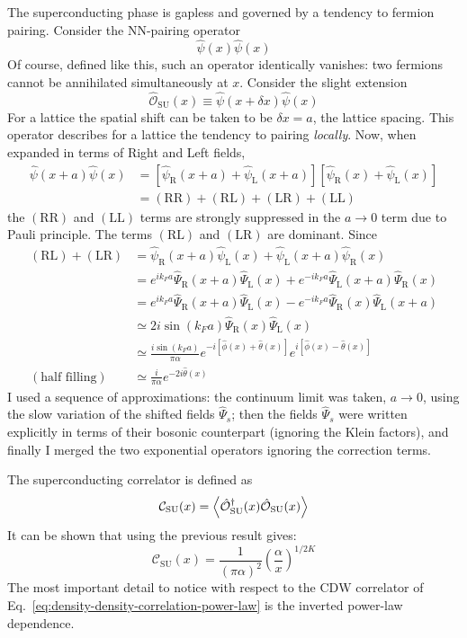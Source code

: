 The superconducting phase is gapless and governed by a tendency to fermion pairing. Consider the NN-pairing operator
\[
	\hat \psi(x) \hat \psi(x)
\]
Of course, defined like this, such an operator identically vanishes: two fermions cannot be annihilated simultaneously at $x$. Consider the slight extension
\[
	\hat{\mathcal{O}}_\mathrm{SU}(x) \equiv \hat \psi (x+\delta x) \hat \psi (x)
\]
For a lattice the spatial shift can be taken to be $\delta x = a$, the lattice spacing. This operator describes for a lattice the tendency to pairing \textit{locally}. Now, when expanded in terms of Right and Left fields,
\[
	\begin{aligned}
		\hat \psi (x+a) \hat \psi(x) &= \left[
			\hat \psi_\mathrm{R} (x+a) +
			\hat \psi_\mathrm{L} (x+a)
		\right] \left[
			\hat \psi_\mathrm{R} (x) +
			\hat \psi_\mathrm{L} (x)
		\right] \\
		&= (\mathrm{RR}) + (\mathrm{RL}) + (\mathrm{LR}) + (\mathrm{LL})
	\end{aligned}
\]
the $(\mathrm{RR})$ and $(\mathrm{LL})$ terms are strongly suppressed in the $a \to 0$ term due to Pauli principle. The terms $(\mathrm{RL})$ and $(\mathrm{LR})$ are dominant. Since
\[
	\begin{aligned}
		(\mathrm{RL}) + (\mathrm{LR}) &= \hat \psi_\mathrm{R} (x+a) \hat \psi_\mathrm{L} (x) + \hat \psi_\mathrm{L} (x+a) \hat \psi_\mathrm{R} (x) \\
		&= e^{ik_F a} \hat \Psi_\mathrm{R} (x+a) \hat \Psi_\mathrm{L} (x) + e^{-ik_F a} \hat \Psi_\mathrm{L} (x+a) \hat \Psi_\mathrm{R} (x) \\
		&= e^{ik_F a} \hat \Psi_\mathrm{R} (x+a) \hat \Psi_\mathrm{L} (x) - e^{-ik_F a} \hat \Psi_\mathrm{R} (x) \hat \Psi_\mathrm{L} (x+a)\\
		&\simeq 2i \sin(k_F a) \hat \Psi_\mathrm{R} (x) \hat \Psi_\mathrm{L} (x) \\
		&\simeq \frac{i \sin(k_F a)}{\pi\alpha} e^{-i \left[ \hat \phi(x) + \hat \theta(x) \right] } e^{i \left[ \hat \phi(x) - \hat \theta(x) \right]} \\
		(\text{half filling})&\simeq \frac{i}{\pi\alpha} e^{-2i\hat\theta(x)}
	\end{aligned}
\]
I used a sequence of approximations: the continuum limit was taken, $a \to 0$, using the slow variation of the shifted fields $\hat \Psi_s$; then the fields $\hat \Psi_s$ were written explicitly in terms of their bosonic counterpart (ignoring the Klein factors), and finally I merged the two exponential operators ignoring the correction terms.

The superconducting correlator is defined as
\[
	\mathcal{C}_\mathrm{SU}(x) = \ev{\hat{\mathcal{O}}_\mathrm{SU}^\dagger(x) \hat{\mathcal{O}}_\mathrm{SU}(x)}
\]
It can be shown that using the previous result gives:
\begin{equation}\label{eq:superconducting-correlation-power-law}
	\mathcal{C}_\mathrm{SU}(x) = \frac{1}{(\pi\alpha)^2} \left(
		\frac{\alpha}{x}
	\right)^{1/2K}
\end{equation}
The most important detail to notice with respect to the $\mathrm{CDW}$ correlator of Eq.~\eqref{eq:density-density-correlation-power-law} is the inverted power-law dependence.